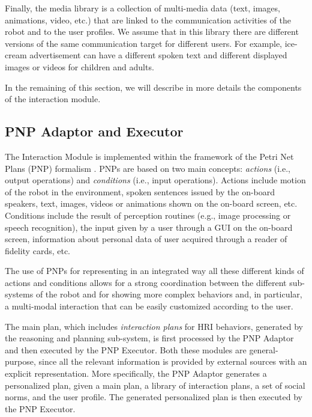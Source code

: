 Finally, the media library is a collection of multi-media data (text, images, animations, video, etc.) that are linked to the communication activities of the robot and to the user profiles. We assume that in this library there are different versions of the same communication target for different users. For example, ice-cream advertisement can have a different spoken text and different displayed images or videos for children and adults.

In the remaining of this section, we will describe in more details the components of the interaction module.

\subsection{PNP Adaptor and Executor}

The Interaction Module is implemented within the framework of the Petri Net Plans (PNP) formalism \cite{ZiIo11PNP}. PNPs are based on two main concepts: \emph{actions} (i.e., output operations) and \emph{conditions} (i.e., input operations). Actions include motion of the robot in the environment, spoken sentences issued by the on-board speakers, text, images, videos or animations shown on the on-board screen, etc.
Conditions include the result of perception routines (e.g., image processing or speech recognition), the input given by a user through a GUI on the on-board screen, information about personal data of user acquired through a reader of fidelity cards, etc.

The use of PNPs for representing in an integrated way all these different kinds of actions and conditions allows for a strong coordination between the different sub-systems of the robot and for showing more complex behaviors and, in particular, a multi-modal interaction that can be easily customized according to the user.

The main plan, which includes \emph{interaction plans} for HRI behaviors, generated by the reasoning and planning sub-system, is first processed by the PNP Adaptor and then executed by the PNP Executor. Both these modules are general-purpose, since all the relevant information is provided by external sources with an explicit representation. More specifically, the PNP Adaptor generates a personalized plan, given a main plan, a library of interaction plans, a set of social norms, and the user profile. The generated personalized plan is then executed by the PNP Executor. 

